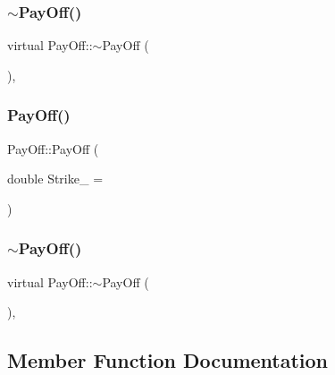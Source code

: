 \subsubsection{\texorpdfstring{$\sim$\+Pay\+Off()}{~PayOff()}\hspace{0.1cm}{\footnotesize\ttfamily [1/2]}}
{\footnotesize\ttfamily virtual Pay\+Off\+::$\sim$\+Pay\+Off (\begin{DoxyParamCaption}{ }\end{DoxyParamCaption})\hspace{0.3cm}{\ttfamily [inline]}, {\ttfamily [virtual]}}

\hypertarget{classPayOff_a811923da1ef0f1c6a49076791c453886}{}\label{classPayOff_a811923da1ef0f1c6a49076791c453886} 
\subsubsection{\texorpdfstring{Pay\+Off()}{PayOff()}\hspace{0.1cm}{\footnotesize\ttfamily [4/4]}}
{\footnotesize\ttfamily Pay\+Off\+::\+Pay\+Off (\begin{DoxyParamCaption}\item[{double}]{Strike\+\_\+ = {} }\end{DoxyParamCaption})}

\hypertarget{classPayOff_ad7aa3a49e4a7e9cab7dc283d69a3f1ff}{}\label{classPayOff_ad7aa3a49e4a7e9cab7dc283d69a3f1ff} 
\subsubsection{\texorpdfstring{$\sim$\+Pay\+Off()}{~PayOff()}\hspace{0.1cm}{\footnotesize\ttfamily [2/2]}}
{\footnotesize\ttfamily virtual Pay\+Off\+::$\sim$\+Pay\+Off (\begin{DoxyParamCaption}{ }\end{DoxyParamCaption})\hspace{0.3cm}{\ttfamily [inline]}, {\ttfamily [virtual]}}



\subsection{Member Function Documentation}
\hypertarget{classPayOff_ad8194d5b82247ae89c25c515f0ba806a}{}\label{classPayOff_ad8194d5b82247ae89c25c515f0ba806a} 
